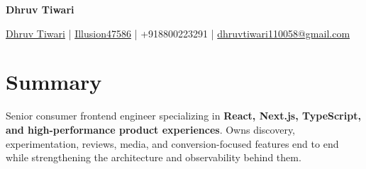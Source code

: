\documentclass[a4paper,11pt]{article}
\newcommand{\socialicon}[1]{\raisebox{-0.05em}{\resizebox{!}{1em}{#1}}}
\newcommand{\headerfontiii}{\fontfamily{ppl}\selectfont} %
\begin{document}
\headerfontiii

\begin{center}
    {\Huge\textbf{Dhruv Tiwari}}
\end{center}
\vspace{-6mm}

\begin{center}
    \small{
    \socialicon{\faLinkedin} \href{https://www.linkedin.com/in/dhruvtiwari47586/}{Dhruv Tiwari} |
    \socialicon{\faGithub} \href{https://github.com/Illusion47586}{Illusion47586} |
    +918800223291 | \href{mailto:dhruvtiwari110058@gmail.com}{dhruvtiwari110058@gmail.com}
    }
\end{center}

\vspace{-6mm}

\section{\textbf{Summary}}
\vspace{1mm}
\small{
Senior consumer frontend engineer specializing in \textbf{React, Next.js, TypeScript, and high-performance product experiences}. Owns discovery, experimentation, reviews, media, and conversion-focused features end to end while strengthening the architecture and observability behind them.
}
\vspace{-2mm}
\end{document}
